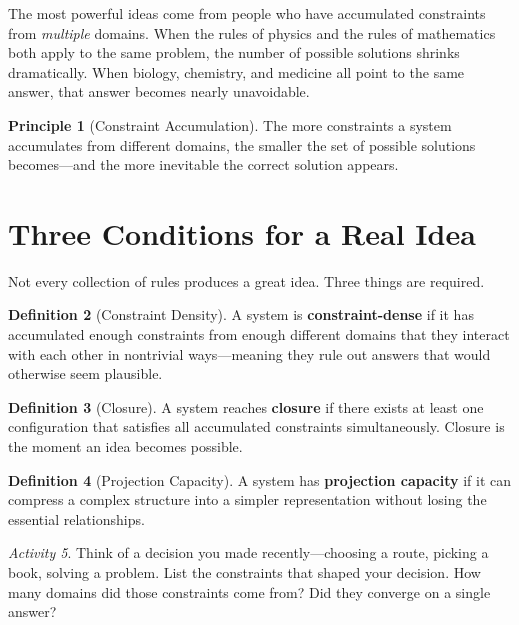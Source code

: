 \documentclass[11pt]{book}
\theoremstyle{definition}
\newtheorem{definition}{Definition}[chapter]
\newtheorem{principle}[definition]{Principle}
\theoremstyle{remark}
\newtheorem{activity}[definition]{Activity}
\begin{document}
The most powerful ideas come from people who have accumulated constraints
from \emph{multiple} domains. When the rules of physics and the rules of
mathematics both apply to the same problem, the number of possible solutions
shrinks dramatically. When biology, chemistry, and medicine all point to
the same answer, that answer becomes nearly unavoidable.

\begin{principle}[Constraint Accumulation]
The more constraints a system accumulates from different domains, the
smaller the set of possible solutions becomes---and the more inevitable
the correct solution appears.
\end{principle}

\section{Three Conditions for a Real Idea}

Not every collection of rules produces a great idea. Three things are required.

\begin{definition}[Constraint Density]
A system is \textbf{constraint-dense} if it has accumulated enough
constraints from enough different domains that they interact with each
other in nontrivial ways---meaning they rule out answers that would
otherwise seem plausible.
\end{definition}

\begin{definition}[Closure]
A system reaches \textbf{closure} if there exists at least one configuration
that satisfies all accumulated constraints simultaneously. Closure is the
moment an idea becomes possible.
\end{definition}

\begin{definition}[Projection Capacity]
A system has \textbf{projection capacity} if it can compress a complex
structure into a simpler representation without losing the essential
relationships.
\end{definition}

\begin{activity}
Think of a decision you made recently---choosing a route, picking a book,
solving a problem. List the constraints that shaped your decision. How many
domains did those constraints come from? Did they converge on a single
answer?
\end{activity}
\end{document}
